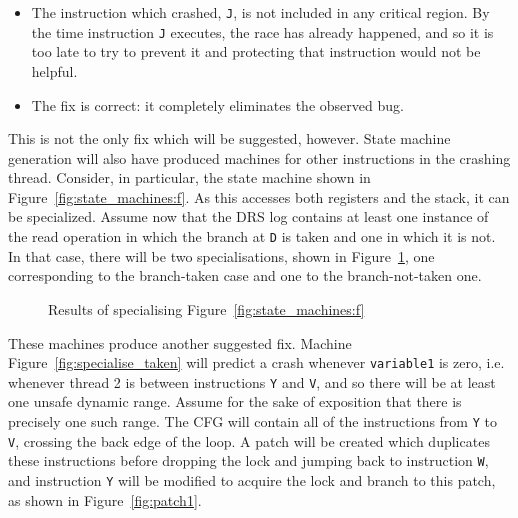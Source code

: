 \documentclass[10pt,letter,twocolumn]{sigplanconf}
\begin{document}
\begin{itemize}
\item The instruction which crashed, \verb|J|, is not included in any
  critical region.  By the time instruction \verb|J| executes, the
  race has already happened, and so it is too late to try to prevent
  it and protecting that instruction would not be helpful.
\item The fix is correct: it completely eliminates the observed bug.
\end{itemize}

This is not the only fix which will be suggested, however.  State
machine generation will also have produced machines for other
instructions in the crashing thread.  Consider, in particular, the
state machine shown in Figure~\ref{fig:state_machines:f}.  As this
accesses both registers and the stack, it can be specialized.  Assume
now that the DRS log contains at least one instance of the read
operation in which the branch at \verb|D| is taken and one in which it
is not.  In that case, there will be two specialisations, shown in
Figure~\ref{fig:example_specialisations}, one corresponding to the
branch-taken case and one to the branch-not-taken one.

\begin{figure}[thb]
\caption{Results of specialising Figure~\ref{fig:state_machines:f}}
\label{fig:example_specialisations}
\end{figure}

These machines produce another suggested fix.  Machine
Figure~\ref{fig:specialise_taken} will predict a crash whenever
\verb|variable1| is zero, i.e. whenever thread 2 is between
instructions \verb|Y| and \verb|V|, and so there will be at least one
unsafe dynamic range.  Assume for the sake of exposition that there is
precisely one such range.  The CFG will contain all of the
instructions from \verb|Y| to \verb|V|, crossing the back edge of the
loop.  A patch will be created which duplicates these instructions
before dropping the lock and jumping back to instruction \verb|W|, and
instruction \verb|Y| will be modified to acquire the lock and branch
to this patch, as shown in Figure~\ref{fig:patch1}.
\end{document}
